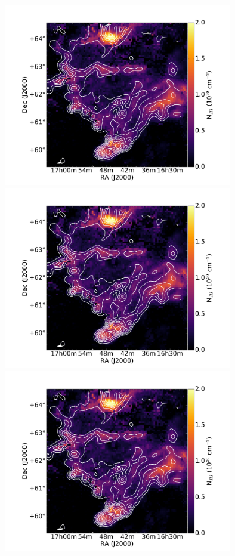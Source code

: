 \documentclass[traditabstract]{aa}
\begin{document}
\begin{figure}[h]
  \centering
  \includegraphics[page=1,height=8cm,trim=140 20 120 70,clip=true]{Figures/GHIGLS_NHI.pdf}
  \hspace{3mm}
  \includegraphics[page=4,height=8cm,trim=140 20 120 70,clip=true]{Figures/GHIGLS_NHI.pdf} \\
  \vspace{3mm}
  \includegraphics[page=2,height=8cm,trim=140 20 120 70,clip=true]{Figures/GHIGLS_NHI.pdf}

\end{figure}
\end{document}
